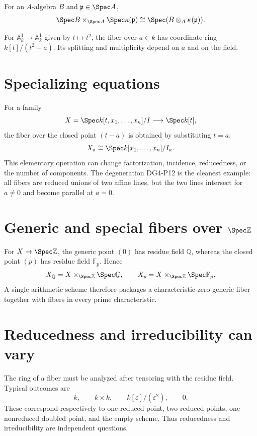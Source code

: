 \begin{theorem}\label{thm:vi25-affine-fiber}
For an $A$-algebra $B$ and $\mathfrak p\in\Spec A$,
\[
\Spec B\times_{\Spec A}\Spec\kappa(\mathfrak p)
\cong\Spec(B\otimes_A\kappa(\mathfrak p)).
\]
\end{theorem}



\begin{example}\label{ex:vi25-expand-01}
For $\mathbb A^1_k\to\mathbb A^1_k$ given by $t\mapsto t^2$, the fiber over $a\in k$ has coordinate ring $k[t]/(t^2-a)$.  Its splitting and multiplicity depend on $a$ and on the field.
\end{example}
\section{Specializing equations}
For a family
\[
X=\Spec k[t,x_1,\dots,x_n]/I\longrightarrow\Spec k[t],
\]
the fiber over the closed point $(t-a)$ is obtained by substituting $t=a$:
\[
X_a\cong\Spec k[x_1,\dots,x_n]/I_a.
\]
This elementary operation can change factorization, incidence, reducedness, or the number of
components.  The degeneration DG4-P12 is the cleanest example: all fibers are reduced unions
of two affine lines, but the two lines intersect for $a\ne0$ and become parallel at $a=0$.



\section{Generic and special fibers over \texorpdfstring{$\Spec\mathbb Z$}{Spec Z}}
For $X\to\Spec\mathbb Z$, the generic point $(0)$ has residue field $\mathbb Q$, whereas the closed
point $(p)$ has residue field $\mathbb F_p$.  Hence
\[
X_{\mathbb Q}=X\times_{\Spec\mathbb Z}\Spec\mathbb Q,
\qquad
X_p=X\times_{\Spec\mathbb Z}\Spec\mathbb F_p.
\]
A single arithmetic scheme therefore packages a characteristic-zero generic fiber together with
fibers in every prime characteristic.



\section{Reducedness and irreducibility can vary}
The ring of a fiber must be analyzed after tensoring with the residue field.  Typical outcomes are
\[
k,\qquad k\times k,\qquad k[\varepsilon]/(\varepsilon^2),\qquad 0.
\]
These correspond respectively to one reduced point, two reduced points, one nonreduced doubled point,
and the empty scheme.  Thus reducedness and irreducibility are independent questions.

